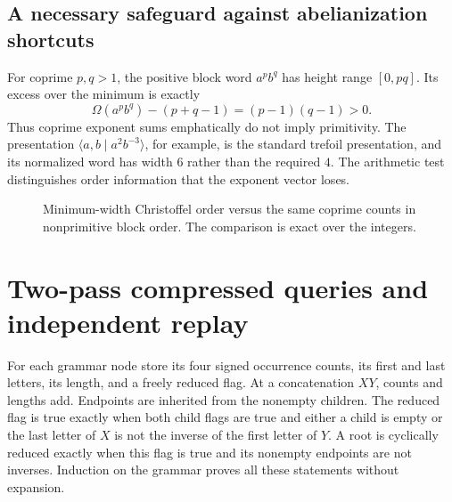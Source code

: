 \documentclass[11pt,letterpaper]{article}
\theoremstyle{definition}
\begin{document}
\subsection{A necessary safeguard against abelianization shortcuts}
For coprime $p,q>1$, the positive block word $a^p b^q$ has height range
$[0,pq]$. Its excess over the minimum is exactly
\begin{equation}
 \Omega(a^p b^q)-(p+q-1)=(p-1)(q-1)>0.
 \label{eq:blockdefect}
\end{equation}
Thus coprime exponent sums emphatically do not imply primitivity.
The presentation $\langle a,b\mid a^2b^{-3}\rangle$, for example, is the
standard trefoil presentation, and its normalized word has width $6$ rather
than the required $4$. The arithmetic test distinguishes order information
that the exponent vector loses.

\begin{figure}[ht]
\centering
{}
\caption{Minimum-width Christoffel order versus the same coprime counts in
nonprimitive block order. The comparison is exact over the integers.}
\label{fig:width}
\end{figure}

\section{Two-pass compressed queries and independent replay}
\label{sec:algorithm}
For each grammar node store its four signed occurrence counts, its first and
last letters, its length, and a freely reduced flag. At a concatenation $XY$,
counts and lengths add. Endpoints are inherited from the nonempty children.
The reduced flag is true exactly when both child flags are true and either a
child is empty or the last letter of $X$ is not the inverse of the first letter
of $Y$. A root is cyclically reduced exactly when this flag is true and its
nonempty endpoints are not inverses. Induction on the grammar proves all
these statements without expansion.
\end{document}
